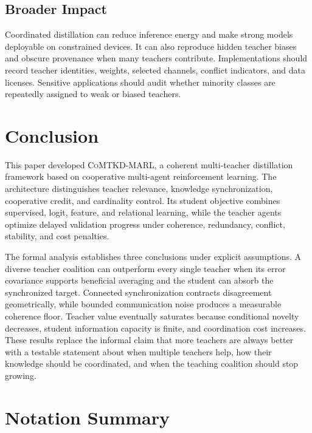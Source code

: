 \documentclass[10pt,twocolumn,a4paper]{article}
\newcommand{\CoMTKD}{\textsc{CoMTKD-MARL}\xspace}
\begin{document}
\subsection{Broader Impact}

Coordinated distillation can reduce inference energy and make strong models deployable on constrained devices. It can also reproduce hidden teacher biases and obscure provenance when many teachers contribute. Implementations should record teacher identities, weights, selected channels, conflict indicators, and data licenses. Sensitive applications should audit whether minority classes are repeatedly assigned to weak or biased teachers.

\section{Conclusion}

This paper developed \CoMTKD, a coherent multi-teacher distillation framework based on cooperative multi-agent reinforcement learning. The architecture distinguishes teacher relevance, knowledge synchronization, cooperative credit, and cardinality control. Its student objective combines supervised, logit, feature, and relational learning, while the teacher agents optimize delayed validation progress under coherence, redundancy, conflict, stability, and cost penalties.

The formal analysis establishes three conclusions under explicit assumptions. A diverse teacher coalition can outperform every single teacher when its error covariance supports beneficial averaging and the student can absorb the synchronized target. Connected synchronization contracts disagreement geometrically, while bounded communication noise produces a measurable coherence floor. Teacher value eventually saturates because conditional novelty decreases, student information capacity is finite, and coordination cost increases. These results replace the informal claim that more teachers are always better with a testable statement about when multiple teachers help, how their knowledge should be coordinated, and when the teaching coalition should stop growing.

\appendix

\section{Notation Summary}
\end{document}
